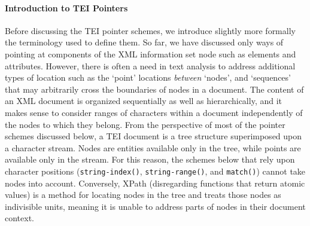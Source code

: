 \paragraph[{Introduction to TEI Pointers}]{Introduction to TEI Pointers}\label{SATSin}\par
Before discussing the TEI pointer schemes, we introduce slightly more formally the terminology used to define them. So far, we have discussed only ways of pointing at components of the XML information set node such as elements and attributes. However, there is often a need in text analysis to address additional types of location such as the ‘point’ locations \textit{between} ‘nodes’, and ‘sequences’ that may arbitrarily cross the boundaries of nodes in a document. The content of an XML document is organized sequentially as well as hierarchically, and it makes sense to consider ranges of characters within a document independently of the nodes to which they belong. From the perspective of most of the pointer schemes discussed below, a TEI document is a tree structure superimposed upon a character stream. Nodes are entities available only in the tree, while points are available only in the stream. For this reason, the schemes below that rely upon character positions (\texttt{string-index()}, \texttt{string-range()}, and \texttt{match()}) cannot take nodes into account. Conversely, XPath (disregarding functions that return atomic values) is a method for locating nodes in the tree and treats those nodes as indivisible units, meaning it is unable to address parts of nodes in their document context.\par
